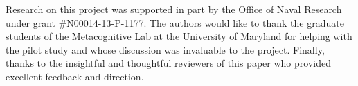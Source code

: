 \documentclass[11pt,letterpaper]{article}
\begin{document}

\begin{acknowledgements}
\noindent
Research on this project was supported in part by the Office of Naval Research under grant \#N00014-13-P-1177. The authors would like to thank the graduate students of the Metacognitive Lab at the University of Maryland for helping with the pilot study and whose discussion was invaluable to the project. Finally, thanks to the insightful and thoughtful reviewers of this paper who provided excellent feedback and direction.
\end{acknowledgements}

\vspace{-0.25in}

{\parindent -10pt\leftskip 10pt\noindent



}

\end{document}
